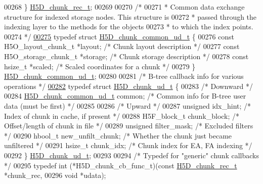 \begin{DoxyCode}
00268 \} \hyperlink{struct_h5_d__chunk__rec__t}{H5D\_chunk\_rec\_t};
00269 
00270 \textcolor{comment}{/*}
00271 \textcolor{comment}{ * Common data exchange structure for indexed storage nodes.  This structure is}
00272 \textcolor{comment}{ * passed through the indexing layer to the methods for the objects}
00273 \textcolor{comment}{ * to which the index points.}
00274 \textcolor{comment}{ */}
\hyperlink{struct_h5_d__chunk__common__ud__t}{00275} \textcolor{keyword}{typedef} \textcolor{keyword}{struct }\hyperlink{struct_h5_d__chunk__common__ud__t}{H5D\_chunk\_common\_ud\_t} \{
00276     \textcolor{keyword}{const} H5O\_layout\_chunk\_t *layout;           \textcolor{comment}{/* Chunk layout description */}
00277     \textcolor{keyword}{const} H5O\_storage\_chunk\_t *storage;         \textcolor{comment}{/* Chunk storage description */}
00278     \textcolor{keyword}{const} hsize\_t *scaled;              \textcolor{comment}{/* Scaled coordinates for a chunk */}
00279 \} \hyperlink{struct_h5_d__chunk__common__ud__t}{H5D\_chunk\_common\_ud\_t};
00280 
00281 \textcolor{comment}{/* B-tree callback info for various operations */}
\hyperlink{struct_h5_d__chunk__ud__t}{00282} \textcolor{keyword}{typedef} \textcolor{keyword}{struct }\hyperlink{struct_h5_d__chunk__ud__t}{H5D\_chunk\_ud\_t} \{
00283     \textcolor{comment}{/* Downward */}
00284     \hyperlink{struct_h5_d__chunk__common__ud__t}{H5D\_chunk\_common\_ud\_t} common;       \textcolor{comment}{/* Common info for B-tree user data (must be
       first) */}
00285 
00286     \textcolor{comment}{/* Upward */}
00287     \textcolor{keywordtype}{unsigned}    idx\_hint;               \textcolor{comment}{/* Index of chunk in cache, if present */}
00288     H5F\_block\_t chunk\_block;            \textcolor{comment}{/* Offset/length of chunk in file */}
00289     \textcolor{keywordtype}{unsigned}    filter\_mask;        \textcolor{comment}{/* Excluded filters */}
00290     hbool\_t     new\_unfilt\_chunk;       \textcolor{comment}{/* Whether the chunk just became unfiltered */}
00291     hsize\_t     chunk\_idx;              \textcolor{comment}{/* Chunk index for EA, FA indexing */}
00292 \} \hyperlink{struct_h5_d__chunk__ud__t}{H5D\_chunk\_ud\_t};
00293 
00294 \textcolor{comment}{/* Typedef for "generic" chunk callbacks */}
00295 \textcolor{keyword}{typedef} int (*H5D\_chunk\_cb\_func\_t)(\textcolor{keyword}{const} \hyperlink{struct_h5_d__chunk__rec__t}{H5D\_chunk\_rec\_t} *chunk\_rec,
00296     \textcolor{keywordtype}{void} *udata);

\end{DoxyCode}
